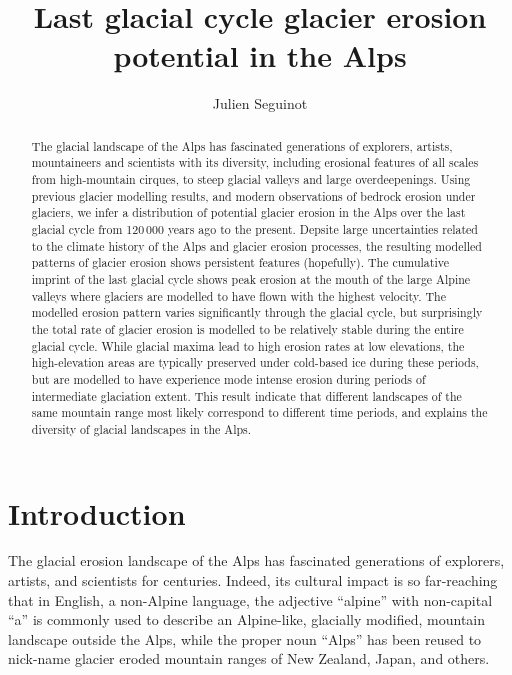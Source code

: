 \documentclass[utf8]{article}
\title{Last glacial cycle glacier erosion potential in the Alps}
\author{Julien Seguinot}
\affil{Anafi, Greece}
\begin{document}

\maketitle

\begin{abstract}

    The glacial landscape of the Alps has fascinated generations of explorers,
    artists, mountaineers and scientists with its diversity, including
    erosional features of all scales from high-mountain cirques, to steep
    glacial valleys and large overdeepenings. Using previous glacier modelling
    results, and modern observations of bedrock erosion under glaciers, we
    infer a distribution of potential glacier erosion in the Alps over the last
    glacial cycle from 120\,000 years ago to the present.
    Depsite large uncertainties related to the climate history of the Alps and
    glacier erosion processes, the resulting modelled patterns of glacier
    erosion shows persistent features (hopefully). The cumulative imprint of
    the last glacial cycle shows peak erosion at the mouth of the large Alpine
    valleys where glaciers are modelled to have flown with the highest
    velocity. The modelled erosion pattern varies significantly through the
    glacial cycle, but surprisingly the total rate of glacier erosion is
    modelled to be relatively stable during the entire glacial cycle.  While
    glacial maxima lead to high erosion rates at low elevations, the
    high-elevation areas are typically preserved under cold-based ice during
    these periods, but are modelled to have experience mode intense erosion
    during periods of intermediate glaciation extent.
    This result indicate that different landscapes of the same mountain range
    most likely correspond to different time periods, and explains the
    diversity of glacial landscapes in the Alps.

\end{abstract}

\section{Introduction}

    The glacial erosion landscape of the Alps has fascinated generations of
    explorers, artists, and scientists for centuries. Indeed, its cultural
    impact is so far-reaching that in English, a non-Alpine language, the
    adjective ``alpine'' with non-capital ``a'' is commonly used to describe
    an Alpine-like, glacially modified, mountain landscape outside the Alps,
    while the proper noun ``Alps'' has been reused to nick-name glacier eroded
    mountain ranges of New Zealand, Japan, and others.
\end{document}
